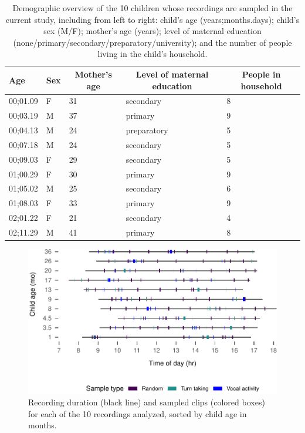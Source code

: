 \documentclass[,man,floatsintext]{apa6}
\begin{document}
\begin{table}[tbp]
\begin{center}
\begin{threeparttable}
\caption{\label{tab:tab1}Demographic overview of the 10 children whose recordings are sampled in the current study, including from left to right: child's age (years;months.days); child's sex (M/F); mother's age (years); level of maternal education (none/primary/secondary/preparatory/university); and the number of people living in the child's household.}
\begin{tabular}{lllll}
\toprule
Age & \multicolumn{1}{c}{Sex} & \multicolumn{1}{c}{Mother's age} & \multicolumn{1}{c}{Level of maternal education} & \multicolumn{1}{c}{People in household}\\
\midrule
00;01.09 & F & 31 & secondary & 8\\
00;03.19 & M & 37 & primary & 9\\
00;04.13 & M & 24 & preparatory & 5\\
00;07.18 & M & 24 & secondary & 5\\
00;09.03 & F & 29 & secondary & 5\\
01;00.29 & F & 30 & primary & 9\\
01;05.02 & M & 25 & secondary & 6\\
01;08.03 & F & 33 & primary & 9\\
02;01.22 & F & 21 & secondary & 4\\
02;11.29 & M & 41 & primary & 8\\
\bottomrule
\end{tabular}
\end{threeparttable}
\end{center}
\end{table}

\begin{figure}
\centering
\includegraphics{Yeli-CLE_files/figure-latex/fig2-1.pdf}
\caption{\label{fig:fig2}Recording duration (black line) and sampled clips
(colored boxes) for each of the 10 recordings analyzed, sorted by child
age in months.}
\end{figure}
\end{document}
